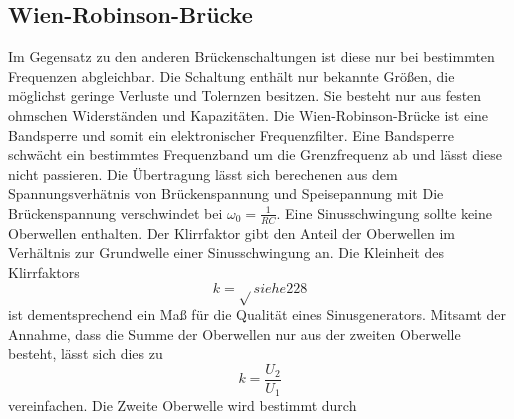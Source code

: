\subsection{Wien-Robinson-Brücke}
\label{subsec:wien-robinson}
Im Gegensatz zu den anderen Brückenschaltungen ist diese nur bei bestimmten Frequenzen abgleichbar.
Die Schaltung enthält nur bekannte Größen, die möglichst geringe Verluste und Tolernzen besitzen.
Sie besteht nur aus festen ohmschen Widerständen und Kapazitäten.
Die Wien-Robinson-Brücke ist eine Bandsperre und somit ein elektronischer Frequenzfilter.
Eine Bandsperre schwächt ein bestimmtes Frequenzband um die Grenzfrequenz
ab und lässt diese nicht passieren.
Die Übertragung lässt sich berechenen aus dem Spannungsverhätnis von Brückenspannung und Speisepannung
mit 
Die Brückenspannung verschwindet bei $\omega_0 = \frac{1}{RC}$.
Eine Sinusschwingung sollte keine Oberwellen enthalten. 
Der Klirrfaktor gibt den Anteil der Oberwellen im Verhältnis zur Grundwelle einer Sinusschwingung an.
Die Kleinheit des Klirrfaktors
\begin{equation}
    k =  \sqrt{} siehe 228
\end{equation}
ist dementsprechend ein Maß für die Qualität eines Sinusgenerators.
Mitsamt der Annahme, dass die Summe der Oberwellen nur aus der zweiten Oberwelle besteht, lässt sich dies zu 
\begin{equation}
    k = \frac{U_2}{U_1}
    \label{eqn:keinf}
\end{equation}
vereinfachen.
Die Zweite Oberwelle wird bestimmt durch

